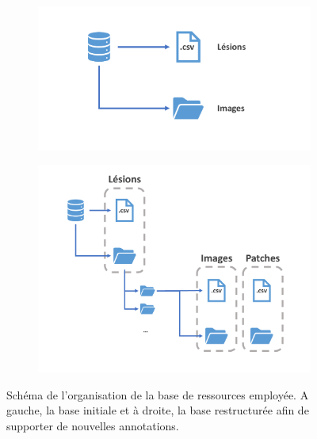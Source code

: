 \begin{figure}[H]
\centering
    \begin{subfigure}{.45\textwidth}
      \centering
      \includegraphics[width=\linewidth]{contents/chapter_3_1/resources/scheme_dbstructure_old.pdf}
    \end{subfigure}
    \begin{subfigure}{.45\textwidth}
      \centering
      \includegraphics[width=\linewidth]{contents/chapter_3_1/resources/scheme_dbstructure_new.pdf}
    \end{subfigure}
    \caption{Schéma de l'organisation de la base de ressources employée. A gauche, la base initiale et à droite, la base restructurée afin de supporter de nouvelles annotations.}
    \label{fig:db_structure}
\end{figure}\par

